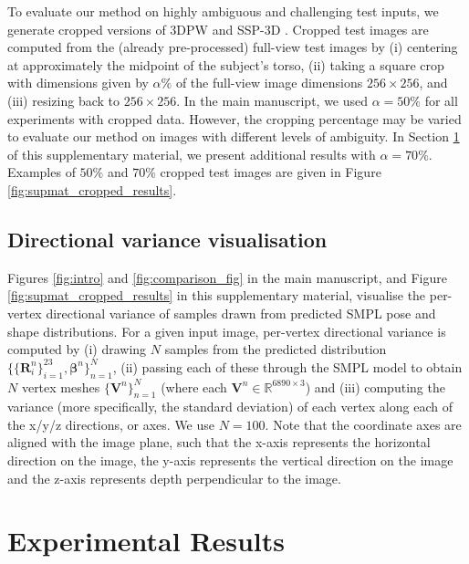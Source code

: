 To evaluate our method on highly ambiguous and challenging test inputs, we generate cropped versions of 3DPW \cite{vonMarcard2018} and SSP-3D \cite{STRAPS2020BMVC}. Cropped test images are computed from the (already pre-processed) full-view test images by (i) centering at approximately the midpoint of the subject's torso, (ii) taking a square crop with dimensions given by $\alpha \%$ of the full-view image dimensions $256 \times 256$, and (iii) resizing back to $256 \times 256$. In the main manuscript, we used $\alpha = 50\%$ for all experiments with cropped data. However, the cropping percentage may be varied to evaluate our method on images with different levels of ambiguity. In Section \ref{sec:supmat_experiments} of this supplementary material, we present additional results with $\alpha = 70\%$. Examples of $50\%$ and $70\%$ cropped test images are given in Figure \ref{fig:supmat_cropped_results}.

\subsection{Directional variance visualisation}

Figures \ref{fig:intro} and \ref{fig:comparison_fig} in the main manuscript, and Figure \ref{fig:supmat_cropped_results} in this supplementary material, visualise the per-vertex directional variance of samples drawn from predicted SMPL pose and shape distributions. For a given input image, per-vertex directional variance is computed by (i) drawing $N$ samples from the predicted distribution $\{\{\mathbf{R}^n_i\}_{i=1}^{23}, \boldsymbol{\beta}^n\}_{n=1}^N$, (ii) passing each of these through the SMPL \cite{SMPL:2015} model to obtain $N$ vertex meshes $\{\mathbf{V}^n\}_{n=1}^N$ (where each $\mathbf{V}^n \in \mathbb{R}^{6890 \times 3}$) and (iii) computing the variance (more specifically, the standard deviation) of each vertex along each of the x/y/z directions, or axes. We use $N=100$. Note that the coordinate axes are aligned with the image plane, such that the x-axis represents the horizontal direction on the image, the y-axis represents the vertical direction on the image and the z-axis represents depth perpendicular to the image.


\section{Experimental Results}
\label{sec:supmat_experiments}

